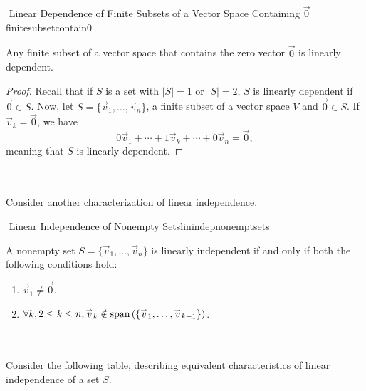         \begin{theorem}{\Stop\,\,Linear Dependence of Finite Subsets of a Vector Space Containing \(\vec{0}\)}{finitesubsetcontain0}
            
            Any finite subset of a vector space that contains the zero vector \(\vec{0}\) is linearly dependent.
            \begin{proof}
                Recall that if \(S\) is a set with \(|S|=1\) or \(|S|=2\), \(S\) is linearly dependent if \(\vec{0}\in S\). Now, let \(S=\{\vec{v}_1,\ldots,\vec{v}_n\}\), a finite subset of a vector space \(V\) and \(\vec{0}\in S\). If \(\vec{v}_k=\vec{0}\), we have
                \begin{equation*}
                    0\vec{v}_1+\cdots+1\vec{v}_k+\cdots+0\vec{v}_n=\vec{0},
                \end{equation*}
                meaning that \(S\) is linearly dependent.
            \end{proof}

        \end{theorem}
        \pagebreak
        \vphantom
        \\
        \\
        Consider another characterization of linear independence.
        \begin{theorem}{\Stop\,\,Linear Independence of Nonempty Sets}{linindepnonemptsets}
        
            A nonempty set \(S=\{\vec{v}_1,\ldots,\vec{v}_n\}\) is linearly independent if and only if both the following conditions hold:
            \begin{enumerate}
                \item \(\vec{v}_1\neq\vec{0}\).
                \item \(\forall k,2\leq k \leq n, \overset{_{\rightharpoonup}}{v}_k\notin\text{span\,}(\{\overset{_{\rightharpoonup}}{v}_1,\ldots,\overset{_{\rightharpoonup}}{v}_{k-1}\})\).
            \end{enumerate}
        
        \end{theorem}
        \vphantom
        \\
        \\
        Consider the following table, describing equivalent characteristics of linear independence of a set \(S\).
